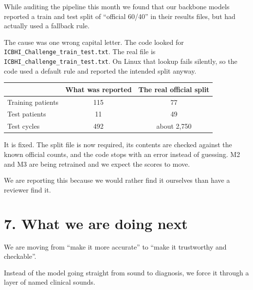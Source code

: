 \documentclass[11pt,a4paper]{article}
\begin{document}
While auditing the pipeline this month we found that our backbone models reported a
train and test split of ``official 60/40'' in their results files, but had actually used
a fallback rule.

The cause was one wrong capital letter. The code looked for
\texttt{ICBHI\_Challenge\_train\_test.txt}. The real file is
\texttt{ICBHI\_challenge\_train\_test.txt}. On Linux that lookup fails silently, so the
code used a default rule and reported the intended split anyway.

\begin{center}
\begin{tabular}{@{}lcc@{}}
\toprule
 & \textbf{What was reported} & \textbf{The real official split} \\
\midrule
Training patients & 115 & 77 \\
Test patients     & 11  & 49 \\
Test cycles       & 492 & about 2,750 \\
\bottomrule
\end{tabular}
\end{center}

\vspace{4pt}
It is fixed. The split file is now required, its contents are checked against the known
official counts, and the code stops with an error instead of guessing. M2 and M3 are
being retrained and we expect the scores to move.

We are reporting this because we would rather find it ourselves than have a reviewer
find it.

\newpage

\section*{7. What we are doing next}

We are moving from ``make it more accurate'' to ``make it trustworthy and checkable''.

Instead of the model going straight from sound to diagnosis, we force it through a layer
of named clinical sounds.
\end{document}
